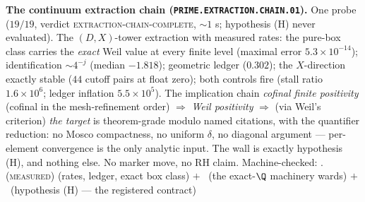\par\smallskip\noindent\textbf{The continuum extraction chain
(\texttt{PRIME.EXTRACTION.CHAIN.01}).}
One probe ($19/19$, verdict
\textsc{extraction-chain-complete}, ${\sim}1$ s; hypothesis (H)
never evaluated).  The $(D, X)$-tower extraction with measured
rates: the pure-box class carries the \emph{exact} Weil value at
every finite level (maximal error $5.3\times10^{-14}$);
identification ${\sim}4^{-j}$ (median $-1.818$); geometric
ledger ($0.302$); the $X$-direction exactly stable ($44$ cutoff
pairs at float zero); both controls fire (stall ratio
$1.6\times10^6$; ledger inflation $5.5\times10^5$).  The
implication chain \emph{cofinal finite positivity} (cofinal in
the mesh-refinement order) $\Rightarrow$
\emph{Weil positivity} $\Rightarrow$ (via Weil's criterion)
\emph{the target} is theorem-grade modulo named citations, with
the quantifier reduction: no Mosco compactness, no uniform
$\delta$, no diagonal argument --- per-element convergence is
the only analytic input.  The wall is exactly hypothesis (H),
and nothing else.  No marker move, no RH claim.
Machine-checked: .
(\textsc{measured}) (rates, ledger, exact box class) $+$ \mE\
(the exact-$\Q$ machinery wards) $+$ \mO\ (hypothesis (H) ---
the registered contract)
\par\smallskip


